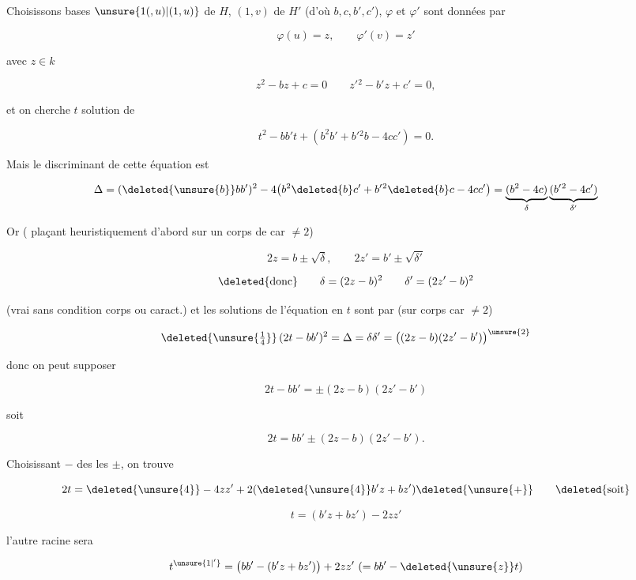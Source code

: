 
Choisissons bases $\unsure{1(,u)|(1,u)}$ de $H$, $(1,v)$ de $H'$
(d'où $b,c,b',c'$), $\varphi$ et $\varphi'$ sont données par

\[
\varphi(u)=z,\qquad\varphi'(v)=z'
\]

avec $z\in k$

\[
z^2-bz+c=0\qquad z'{}^2-b'z+c'=0,
\]

et on cherche $t$ solution de

\[
t^2-bb't+(b^2b'+b'{}^2b-4cc')=0.
\]

Mais le discriminant de cette équation est

\[
\Delta=(\deleted{\unsure{b}}bb')^2-4\bigl(b^2\deleted{b}c'+b'{}^2\deleted{b}c-4cc'\bigr)=
\underbrace{(b^2-4c)}_{\delta}\underbrace{(b'{}^2-4c')}_{\delta'}
\]

Or  ( plaçant  heuristiquement
d'abord sur un corps de car $\ne2$)

\[
2z=b\pm\sqrt{\delta},\qquad 2z'=b'\pm\sqrt{\delta'}
\]

\[
\text{\deleted{donc}}\qquad\delta=(2z-b)^2\qquad\delta'=(2z'-b)^2
\]

(vrai sans condition corps ou caract.)
et les solutions de l'équation en $t$ sont  par
(sur corps car $\ne2$) 

\[
\deleted{\unsure{\tfrac14}}\,(2t-bb')^2=\Delta=\delta\delta'=\bigl((2z-b)(2z'-b')\bigr)^{\unsure{2}}
\]

donc on peut  supposer

\[
2t-bb'=\pm(2z-b)(2z'-b')
\]

soit

\[
2t=bb'\pm(2z-b)(2z'-b').
\]

Choisissant $-$ des  les $\pm$, on trouve

\[
2t=\deleted{\unsure{4}}-4zz'+2(\deleted{\unsure{4}}b'z+bz')\deleted{\unsure{+}}\qquad\text{\deleted{soit}}
\]

\[
\boxed{t=(b'z+bz')-2zz'}
\]

l'autre racine sera

\[
t^{\unsure{1|'}}=\bigl(bb'-(b'z+bz')\bigr)+2zz'\ (=bb'-\deleted{\unsure{z}}t)
\]


